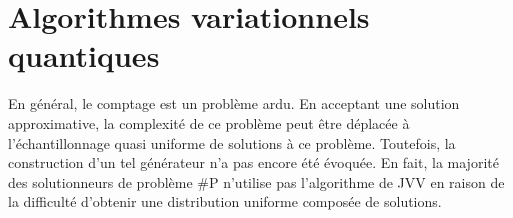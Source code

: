 \chapter{Algorithmes variationnels quantiques}

En général, le comptage est un problème ardu. En acceptant une solution approximative, la complexité de ce problème peut être déplacée à l'échantillonnage quasi uniforme de solutions à ce problème. Toutefois, la construction d'un tel générateur n'a pas encore été évoquée. En fait, la majorité des solutionneurs de problème \textsf{\#P} n'utilise pas l'algorithme de JVV en raison de la difficulté d'obtenir une distribution uniforme composée de solutions. 


